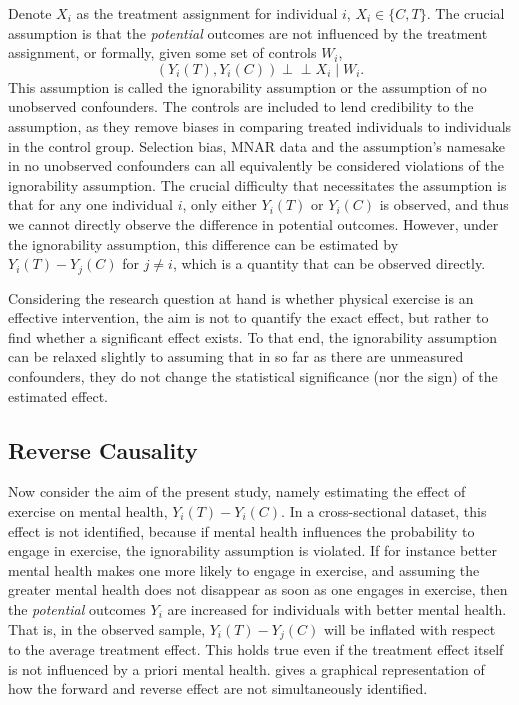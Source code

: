 Denote $X_i$ as the treatment assignment for individual $i$, $X_i \in \{C, T\}$. The crucial assumption is that the
\textit{potential} outcomes are not influenced by the treatment assignment, or formally, given some set of controls
$W_i$,
\begin{equation}
    \label{eq:methods:ignorability_assumption}
    (Y_i(T), Y_i(C)) \perp\!\!\!\perp X_i \mid W_i.
\end{equation}
This assumption is called the ignorability assumption or the assumption of no unobserved confounders.
The controls are included to lend credibility to the assumption, as they remove biases in comparing treated individuals
to individuals in the control group.
Selection bias, MNAR data and the assumption's namesake in no unobserved confounders can all equivalently be considered
violations of the ignorability assumption.
The crucial difficulty that necessitates the assumption is that for any one individual $i$,
only either $Y_i(T)$ or $Y_i(C)$ is observed, and thus we cannot directly observe the difference in potential outcomes.
However, under the ignorability assumption, this difference can be estimated by $Y_i(T) - Y_j(C)$ for $j \neq i$,
which is a quantity that can be observed directly.

Considering the research question at hand is whether physical exercise is an effective intervention, the aim is not to
quantify the exact effect, but rather to find whether a significant effect exists. To that end, the ignorability assumption
can be relaxed slightly to assuming that in so far as there are unmeasured confounders, they do not change the statistical
significance (nor the sign) of the estimated effect.

\subsection{Reverse Causality}
Now consider the aim of the present study, namely estimating the effect of exercise on mental health, $Y_i(T) - Y_i(C)$.
In a cross-sectional dataset, this effect is not identified,
because if mental health influences the probability to engage in exercise, the ignorability assumption is violated.
If for instance better mental health makes one more likely to engage in exercise, and assuming the greater mental health
does not disappear as soon as one engages in exercise, then the \textit{potential} outcomes $Y_i$ are increased
for individuals with better mental health. That is, in the observed sample, $Y_i(T) - Y_j(C)$ will be inflated with respect to
the average treatment effect.
This holds true even if the treatment effect itself is not influenced by a priori mental health.
 gives a graphical representation of how the forward and reverse effect
are not simultaneously identified.

